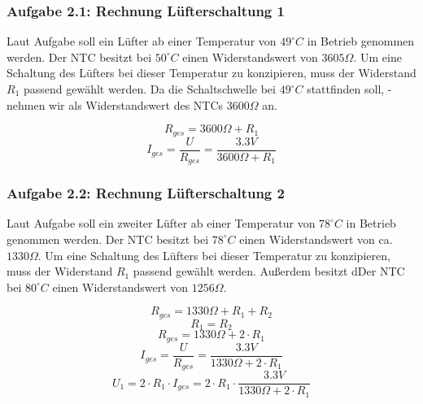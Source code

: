 \newpage

\subsubsection{Aufgabe 2.1: Rechnung Lüfterschaltung 1}

Laut Aufgabe soll ein Lüfter ab einer Temperatur von $49^{\circ} C$ in Betrieb genommen werden. Der NTC besitzt bei $50^{\circ} C$ einen Widerstandswert von $3605 \Omega$. Um eine Schaltung des Lüfters bei dieser Temperatur zu konzipieren, muss der Widerstand $R_1$ passend gewählt werden. Da die Schaltschwelle bei $49^{\circ} C$ stattfinden soll, -nehmen wir als Widerstandswert des NTCs $3600 \Omega$ an.

\[ R_{ges} = 3600 \Omega + R_1 \]
\[ I_{ges} = \frac{U}{R_{ges}} = \frac{3.3 V}{3600 \Omega + R_1} \]


\subsubsection{Aufgabe 2.2: Rechnung Lüfterschaltung 2}

Laut Aufgabe soll ein zweiter Lüfter ab einer Temperatur von $78^{\circ} C$ in Betrieb genommen werden. Der NTC besitzt bei $78^{\circ} C$ einen Widerstandswert von ca. $1330 \Omega$. Um eine Schaltung des Lüfters bei dieser Temperatur zu konzipieren, muss der Widerstand $R_1$ passend gewählt werden. Außerdem besitzt dDer NTC bei $80^{\circ} C$ einen Widerstandswert von $1256 \Omega$. \cite{ntc}

\[ R_{ges} = 1330 \Omega + R_1 + R_2\]
\[ R_1 = R_2 \]
\[ R_{ges} = 1330 \Omega + 2 \cdot R_1 \]
\[ I_{ges} = \frac{U}{R_{ges}} = \frac{3.3 V}{1330 \Omega + 2 \cdot R_1} \]
\[ U_{1} = 2 \cdot R_1 \cdot I_{ges} = 2 \cdot R_1 \cdot \frac{3.3 V}{1330 \Omega + 2 \cdot R_1} \]


